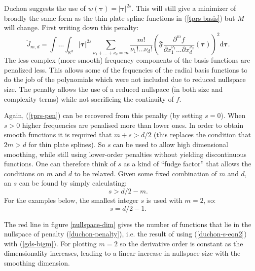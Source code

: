 Duchon suggests the use of $w(\boldsymbol{\tau})= \lvert \boldsymbol{\tau} \rvert^{2s}$. This will still give a minimizer of broadly the same form as the thin plate spline functions in (\ref{tprs-basis}) but $M$ will change. First writing down this penalty:
\begin{equation}
\breve{J}_{m,d} = \int \ldots \int_{\mathbb{R}^d} \lvert \boldsymbol{\tau} \rvert^{2s} \sum_{\nu_1 + \dots + \nu_d=m} \frac{m!}{\nu_1! \dots \nu_d!}\left ( \mathfrak{F} \frac{\partial^m f}{\partial x_1^{\nu_1} \ldots  \partial x_d^{\nu_d}} \left (\boldsymbol{\tau} \right ) \right )^2 \text{d} \boldsymbol{\tau}.
\label{duchon-penalty}
\end{equation}
The less complex (more smooth) frequency components of the basis functions are penalized less. This allows some of the fequencies of  the radial basis functions to do the job of the polynomials which were not included due to reduced nullspace size. The penalty allows the use of a reduced nullspace (in both size and complexity terms) while not sacrificing the continuity of $f$. 

Again, (\ref{tprs-pen}) can be recovered from this penalty (by setting $s=0$). When $s>0$ higher frequencies are penalised more than lower ones. In order to obtain smooth functions it is required that $m+s>d/2$ (this replaces the condition that $2m>d$ for thin plate splines). So $s$ can be used to allow high dimensional smoothing, while still using lower-order penalties without yielding discontinuous functions. One can therefore think of $s$ as a kind of ``fudge factor'' that allows the conditions on $m$ and $d$ to be relaxed. Given some fixed combination of $m$ and $d$, an $s$ can be found by simply calculating:
\begin{equation}
s>d/2-m.
\label{duchon-s-eqn}
\end{equation}
For the examples below, the smallest integer $s$ is used with $m=2$, so:
\begin{equation}
s=d/2-1.
\label{duchon-s-eqn2}
\end{equation}

The red line in figure \ref{nullspace-dim} gives the number of functions that lie in the nullspace of penalty (\ref{duchon-penalty}), i.e. the result of using (\ref{duchon-s-eqn2}) with (\ref{gds-bigm}). For plotting $m=2$ so the derivative order is constant as the dimensionality increases, leading to a linear increase in nullspace size with the smoothing dimension.



